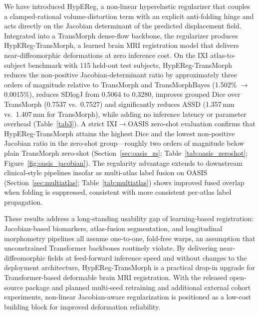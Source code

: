 \documentclass[jimaging,article,submit,pdftex,moreauthors]{Definitions/mdpi}
\begin{document}
We have introduced HypEReg, a non-linear hyperelastic regularizer that couples a clamped-rational volume-distortion term with an explicit anti-folding hinge and acts directly on the Jacobian determinant of the predicted displacement field. Integrated into a TransMorph dense-flow backbone, the regularizer produces HypEReg-TransMorph, a learned brain MRI registration model that delivers near-diffeomorphic deformations at zero inference cost. On the IXI atlas-to-subject benchmark with 115 held-out test subjects, HypEReg-TransMorph reduces the non-positive Jacobian-determinant ratio by approximately three orders of magnitude relative to TransMorph and TransMorphBayes (1.502\% \(\to\) 0.0015\%), reduces SDlogJ from 0.5064 to 0.3280, improves grouped Dice over TransMorph (0.7537 vs.\ 0.7527) and significantly reduces ASSD (1.357\,mm vs.\ 1.407\,mm for TransMorph), while adding no inference latency or parameter overhead (Table~\ref{tab3}). A strict IXI\(\to\)OASIS zero-shot evaluation confirms that HypEReg-TransMorph attains the highest Dice and the lowest non-positive Jacobian ratio in the zero-shot group---roughly two orders of magnitude below plain TransMorph zero-shot (Section~\ref{sec:oasis_zs}; Table~\ref{tab:oasis_zeroshot}; Figure~\ref{fig:oasis_jacobian}). The regularity advantage extends to downstream clinical-style pipelines insofar as multi-atlas label fusion on OASIS (Section~\ref{sec:multiatlas}; Table~\ref{tab:multiatlas}) shows improved fused overlap when folding is suppressed, consistent with more consistent per-atlas label propagation.

These results address a long-standing usability gap of learning-based registration: Jacobian-based biomarkers, atlas-fusion segmentation, and longitudinal morphometry pipelines all assume one-to-one, fold-free warps, an assumption that unconstrained Transformer backbones routinely violate. By delivering near-diffeomorphic fields at feed-forward inference speed and without changes to the deployment architecture, HypEReg-TransMorph is a practical drop-in upgrade for Transformer-based deformable brain MRI registration. With the released open-source package and planned multi-seed retraining and additional external cohort experiments, non-linear Jacobian-aware regularization is positioned as a low-cost building block for improved deformation reliability.

\vspace{6pt}
\end{document}
